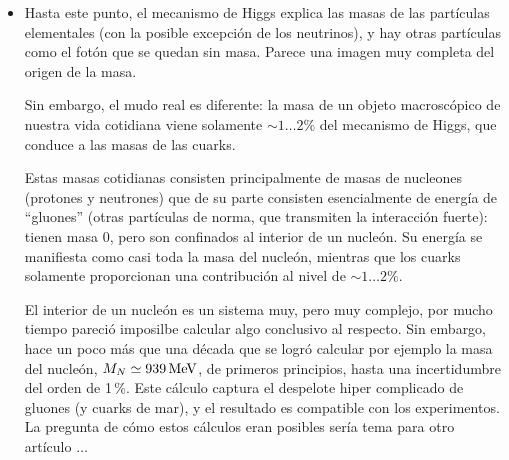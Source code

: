 \begin{itemize}
\item Hasta este punto, el mecanismo de Higgs explica las masas
de las part\'iculas elementales (con la posible excepci\'on de
los neutrinos), y hay otras part\'iculas como el fot\'on que
se quedan sin masa. Parece una imagen muy completa del
origen de la masa.

Sin embargo, el mudo real es diferente: la masa de un objeto
macrosc\'opico de nuestra vida cotidiana viene solamente
$\sim 1 \dots 2 \%$ del mecanismo de Higgs, que conduce a las
masas de las cuarks.

Estas masas cotidianas consisten principalmente de masas de
nucleones (protones y neutrones) que de su parte consisten
esencialmente de energ\'ia de ``gluones'' (otras part\'iculas de
norma, que transmiten la interacci\'on fuerte): tienen masa 0,
pero son confinados al interior de un nucle\'on. Su energ\'ia se
manifiesta como casi toda la masa del nucle\'on, mientras que
los cuarks solamente proporcionan una contribuci\'on al nivel
de $\sim 1 \dots 2 \%$.

El interior de un nucle\'on es un sistema muy, pero muy complejo,
por mucho tiempo pareci\'o imposilbe calcular algo conclusivo
al respecto. Sin embargo, hace un poco m\'as que una d\'ecada que
se logr\'o calcular por ejemplo la masa del nucle\'on,
$M_N \simeq 939\,{\rm MeV}$, de primeros principios, hasta una
incertidumbre del orden de 1\,\%. Este c\'alculo captura
el despelote hiper complicado de gluones (y cuarks de mar), y el
resultado es compatible con los experimentos. La pregunta de
c\'omo estos c\'alculos eran posibles ser\'ia tema para otro
art\'iculo $\dots$

\end{itemize}